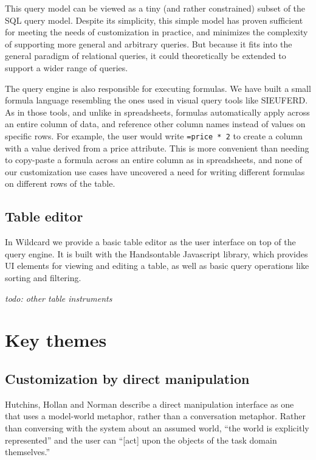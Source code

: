 \documentclass[sigplan,10pt,anonymous,review]{acmart}
\begin{document}
This query model can be viewed as a tiny (and rather constrained) subset
of the SQL query model. Despite its simplicity, this simple model has
proven sufficient for meeting the needs of customization in practice,
and minimizes the complexity of supporting more general and arbitrary
queries. But because it fits into the general paradigm of relational
queries, it could theoretically be extended to support a wider range of
queries.

The query engine is also responsible for executing formulas. We have
built a small formula language resembling the ones used in visual query
tools like SIEUFERD. As in those tools, and unlike in spreadsheets,
formulas automatically apply across an entire column of data, and
reference other column names instead of values on specific rows. For
example, the user would write \texttt{=price\ *\ 2} to create a column
with a value derived from a price attribute. This is more convenient
than needing to copy-paste a formula across an entire column as in
spreadsheets, and none of our customization use cases have uncovered a
need for writing different formulas on different rows of the table.

\hypertarget{table-editor}{%
\subsection{Table editor}\label{table-editor}}

In Wildcard we provide a basic table editor as the user interface on top
of the query engine. It is built with the Handsontable Javascript
library, which provides UI elements for viewing and editing a table, as
well as basic query operations like sorting and filtering.

\emph{todo: other table instruments}

\hypertarget{sec:themes}{%
\section{Key themes}\label{sec:themes}}

\hypertarget{customization-by-direct-manipulation}{%
\subsection{Customization by direct
manipulation}\label{customization-by-direct-manipulation}}

Hutchins, Hollan and Norman \citep{hutchins1985} describe a direct
manipulation interface as one that uses a model-world metaphor, rather
than a conversation metaphor. Rather than conversing with the system
about an assumed world, ``the world is explicitly represented'' and the
user can ``{[}act{]} upon the objects of the task domain themselves.''
\end{document}
